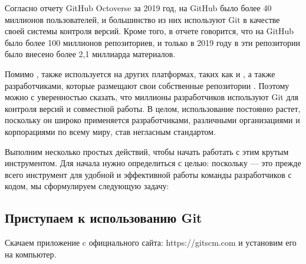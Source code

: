 \documentclass[letterpaper,10pt,russian]{sphinxmanual}
\begin{document}
\sphinxAtStartPar
Согласно отчету GitHub Octoverse за 2019 год, на GitHub было более 40 миллионов пользователей, и большинство из них используют Git в качестве своей системы контроля версий. Кроме того, в отчете говорится, что на GitHub было более 100 миллионов репозиториев, и только в 2019 году в эти репозитории было внесено более 2,1 миллиарда материалов.

\sphinxAtStartPar
Помимо ,  также используется на других платформах, таких как  и , а также разработчиками, которые размещают свои собственные репозитории . Поэтому можно с уверенностью сказать, что миллионы разработчиков используют Git для контроля версий и совместной работы. В целом, использование  постоянно растет, поскольку он широко применяется разработчиками, различными организациями и корпорациями по всему миру, став негласным стандартом.

\sphinxAtStartPar
Выполним несколько простых действий, чтобы начать работать с этим крутым инструментом. Для начала нужно определиться с целью: поскольку  — это прежде всего инструмент для удобной и эффективной работы команды разработчиков с кодом, мы сформулируем следующую задачу:
\begin{quote}

\sphinxAtStartPar
{}
\end{quote}


\subsection{Приступаем к использованию Git}
\label{\detokenize{educational_materials/git_base/content:id3}}
\sphinxAtStartPar
Скачаем приложение  c официального сайта: https://git\sphinxhyphen{}scm.com и установим его на компьютер.
\end{document}
